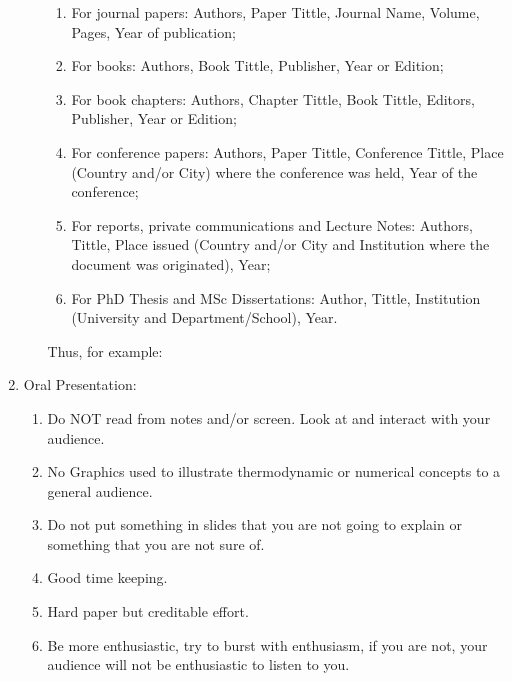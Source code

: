 \documentclass[14pt,twoside]{report}
\begin{document}
\begin{enumerate}
\begin{enumerate}
\begin{enumerate}
\item For journal papers: Authors, Paper Tittle, Journal Name, Volume, Pages, Year of publication;
\item For books: Authors, Book Tittle, Publisher, Year or Edition;
\item For book chapters: Authors, Chapter Tittle, Book Tittle, Editors, Publisher, Year or Edition;
\item For conference papers: Authors, Paper Tittle, Conference Tittle, Place (Country and/or City) where the conference was held, Year of the conference;
\item For reports,  private communications and Lecture Notes: Authors, Tittle, Place issued (Country and/or City and Institution where the document was originated), Year;
\item For PhD Thesis and MSc Dissertations: Author, Tittle, Institution (University and Department/School), Year.
\end{enumerate}  
Thus, for example:
%
\end{enumerate}

\item Oral Presentation:
\begin{enumerate}
%
\item Do NOT read from notes and/or screen. Look at and interact with your audience.
%
\item No Graphics used to illustrate thermodynamic or numerical concepts to a general audience.
%
\item Do not put something in slides that you are not going to explain or something that you are not sure of.
%
\item Good time keeping.
%
\item Hard paper but creditable effort.
%
\item Be more enthusiastic, try to burst with enthusiasm, if you are not, your audience will not be enthusiastic to listen to you.
%
\end{enumerate}

\end{enumerate}
\end{document}
